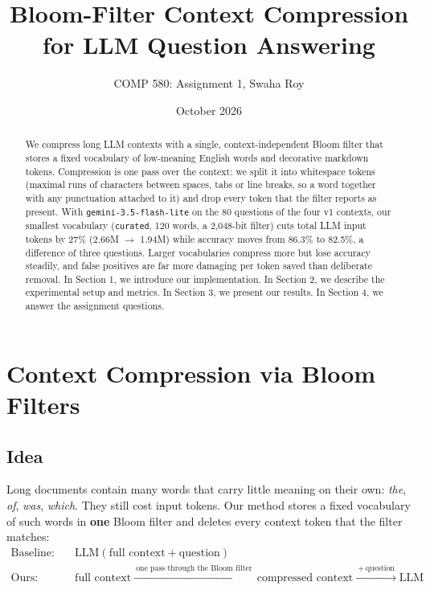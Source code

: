 \documentclass[11pt]{article}
\title{Bloom-Filter Context Compression for LLM Question Answering}
\author{COMP 580: Assignment 1, Swaha Roy}
\date{October 2026}
\newcommand{\code}[1]{\texttt{#1}}
\begin{document}
\maketitle

\begin{abstract}
We compress long LLM contexts with a single, context-independent Bloom filter that stores a fixed
vocabulary of low-meaning English words and decorative markdown tokens. Compression is one pass
over the context: we split it into whitespace tokens (maximal runs of characters between spaces,
tabs or line breaks, so a word together with any punctuation attached to it) and drop every token
that the filter reports as present. With
\code{gemini-3.5-flash-lite} on the 80 questions of the four v1 contexts, our smallest vocabulary
(\code{curated}, 120 words, a 2{,}048-bit filter) cuts total LLM input tokens by 27\%
(2.66M $\to$ 1.94M) while accuracy moves from 86.3\% to 82.5\%, a difference of three questions.
Larger vocabularies compress more but lose accuracy steadily, and
false positives are far more damaging per token saved than deliberate removal. 
In Section 1, we introduce our implementation. In Section 2, we describe the experimental setup and metrics. 
In Section 3, we present our results. In Section 4, we answer the assignment questions.
\end{abstract}

\section{Context Compression via Bloom Filters}
\label{sec:method}

\subsection{Idea}
Long documents contain many words that carry little meaning on their own: \emph{the}, \emph{of},
\emph{was}, \emph{which}. They still cost input tokens. Our method stores a fixed vocabulary of such
words in \textbf{one} Bloom filter and deletes every context token that the filter matches:
\begin{align*}
\text{Baseline:}\quad & \mathrm{LLM}(\text{full context} + \text{question})\\
\text{Ours:}\quad & \text{full context} \xrightarrow{\ \text{one pass through the Bloom filter}\ }
  \text{compressed context} \xrightarrow{\ +\ \text{question}\ } \mathrm{LLM}
\end{align*}
\end{document}

